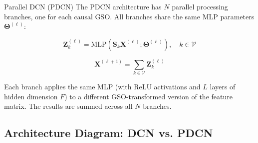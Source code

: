 \begin{mathbox}{Parallel DCN (PDCN)}
The PDCN architecture has $N$ parallel processing branches, one for each causal
GSO. All branches share the same MLP parameters $\boldsymbol{\Theta}^{(\ell)}$:

\begin{equation}
    \mathbf{Z}_k^{(\ell)} = \text{MLP}\!\left(\mathbf{S}_k \mathbf{X}^{(\ell)};
    \boldsymbol{\Theta}^{(\ell)}\right), \quad k \in \mathcal{V}
    \label{eq:pdcn_branch}
\end{equation}

\begin{equation}
    \mathbf{X}^{(\ell+1)} = \sum_{k \in \mathcal{V}} \mathbf{Z}_k^{(\ell)}
    \label{eq:pdcn_sum}
\end{equation}

Each branch applies the same MLP (with ReLU activations and $L$ layers of
hidden dimension $F$) to a different GSO-transformed version of the feature
matrix. The results are summed across all $N$ branches.
\end{mathbox}

\subsection{Architecture Diagram: DCN vs. PDCN}

